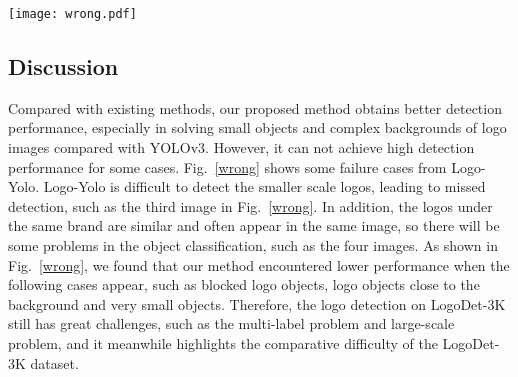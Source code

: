 \documentclass[journal]{IEEEtran}
\begin{document}
\begin{table}[!t]
	\caption{Evaluation retrieval results on FlickrLogos-32 (\%).}
	\label{Retrieval}
	\centering
\end{table}
\begin{figure*}[!htbp]
	\centering
	\texttt{[image: wrong.pdf]}
	\caption{Qualitative result of some failure cases on Logo-Yolo. Green boxes denotes the ground-truth. Red boxes represent correct logo detections, while yellow are mistakes.}
	\label{wrong}
\end{figure*}
\subsection{Discussion}
Compared with existing methods, our proposed method obtains better detection performance, especially in solving small objects and complex backgrounds of logo images compared with YOLOv3. However, it can not achieve high detection performance for some cases. Fig.~\ref{wrong} shows some failure cases from Logo-Yolo. Logo-Yolo is difficult to detect the smaller scale logos, leading to missed detection, such as the third image in Fig.~\ref{wrong}. In addition, the logos under the same brand are similar and often appear in the same image, so there will be some problems in the object classification, such as the four images. As shown in Fig.~\ref{wrong}, we found that our method encountered lower performance when the following cases appear, such as blocked logo objects, logo objects close to the background and very small objects. Therefore, the logo detection on LogoDet-3K still has great challenges, such as the multi-label problem and large-scale problem, and it meanwhile highlights the comparative difficulty of the LogoDet-3K dataset.
\end{document}
